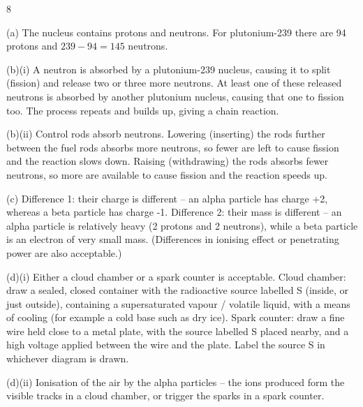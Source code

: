 \begin{question}{8}
\markscheme
{}
\endms

\exemplar
(a) The nucleus contains protons and neutrons. For plutonium-239 there are 94 protons and $239 - 94 = 145$ neutrons.

(b)(i) A neutron is absorbed by a plutonium-239 nucleus, causing it to split (fission) and release two or three more neutrons. At least one of these released neutrons is absorbed by another plutonium nucleus, causing that one to fission too. The process repeats and builds up, giving a chain reaction.

(b)(ii) Control rods absorb neutrons. Lowering (inserting) the rods further between the fuel rods absorbs more neutrons, so fewer are left to cause fission and the reaction slows down. Raising (withdrawing) the rods absorbs fewer neutrons, so more are available to cause fission and the reaction speeds up.

(c) Difference 1: their charge is different -- an alpha particle has charge +2, whereas a beta particle has charge -1. Difference 2: their mass is different -- an alpha particle is relatively heavy (2 protons and 2 neutrons), while a beta particle is an electron of very small mass. (Differences in ionising effect or penetrating power are also acceptable.)

(d)(i) Either a cloud chamber or a spark counter is acceptable. Cloud chamber: draw a sealed, closed container with the radioactive source labelled S (inside, or just outside), containing a supersaturated vapour / volatile liquid, with a means of cooling (for example a cold base such as dry ice). Spark counter: draw a fine wire held close to a metal plate, with the source labelled S placed nearby, and a high voltage applied between the wire and the plate. Label the source S in whichever diagram is drawn.

(d)(ii) Ionisation of the air by the alpha particles -- the ions produced form the visible tracks in a cloud chamber, or trigger the sparks in a spark counter.
\endexemplar
\end{question}

